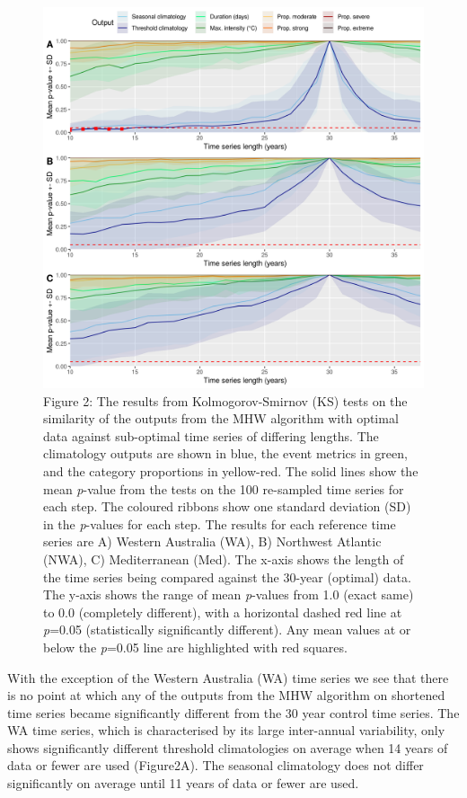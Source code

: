 \documentclass[utf8]{frontiersSCNS} %
\begin{document}
\begin{figure}
\centering
\includegraphics{../LaTeX/fig_2.png}
\caption{Figure 2: The results from Kolmogorov-Smirnov (KS) tests on the
similarity of the outputs from the MHW algorithm with optimal data
against sub-optimal time series of differing lengths. The climatology
outputs are shown in blue, the event metrics in green, and the category
proportions in yellow-red. The solid lines show the mean \emph{p}-value
from the tests on the 100 re-sampled time series for each step. The
coloured ribbons show one standard deviation (SD) in the \emph{p}-values
for each step. The results for each reference time series are A) Western
Australia (WA), B) Northwest Atlantic (NWA), C) Mediterranean (Med). The
x-axis shows the length of the time series being compared against the
30-year (optimal) data. The y-axis shows the range of mean
\emph{p}-values from 1.0 (exact same) to 0.0 (completely different),
with a horizontal dashed red line at \emph{p}=0.05 (statistically
significantly different). Any mean values at or below the \emph{p}=0.05
line are highlighted with red squares.}
\end{figure}

With the exception of the Western Australia (WA) time series we see that
there is no point at which any of the outputs from the MHW algorithm on
shortened time series became significantly different from the 30 year
control time series. The WA time series, which is characterised by its
large inter-annual variability, only shows significantly different
threshold climatologies on average when 14 years of data or fewer are
used (Figure2A). The seasonal climatology does not differ significantly
on average until 11 years of data or fewer are used.
\end{document}
